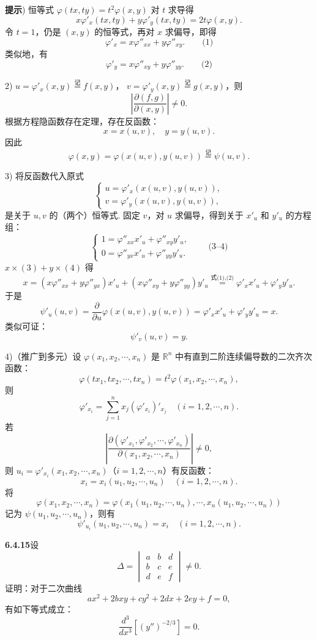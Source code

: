 \documentclass[UTF8,12pt,a4paper,fontset=fandol]{ctexart}
\begin{document}
\noindent\textbf{提示}) 恒等式 $\varphi(tx,ty)=t^2\varphi(x,y)$ 对 $t$ 求导得
\[
  x\varphi'_x(tx,ty)+y\varphi'_y(tx,ty)=2t\varphi(x,y).
\]
令 $t=1$，仍是 $(x,y)$ 的恒等式，再对 $x$ 求偏导，即得
\[
  \varphi'_x=x\varphi''_{xx}+y\varphi''_{xy}. \qquad\text{(1)}
\]
类似地，有
\[
  \varphi'_y=x\varphi''_{xy}+y\varphi''_{yy}. \qquad\text{(2)}
\]

2) $u=\varphi'_x(x,y)\overset{\text{记}}{=}f(x,y)$，
$v=\varphi'_y(x,y)\overset{\text{记}}{=}g(x,y)$，则
\[
  \left|\frac{\partial(f,g)}{\partial(x,y)}\right|\ne0.
\]
根据方程隐函数存在定理，存在反函数：
\[
  x=x(u,v),\quad y=y(u,v).
\]
因此
\[
  \varphi(x,y)=\varphi(x(u,v),y(u,v))\overset{\text{记}}{=}\psi(u,v).
\]

3) 将反函数代入原式
\[
\begin{cases}
  u=\varphi'_x(x(u,v),y(u,v)),\\
  v=\varphi'_y(x(u,v),y(u,v)),
\end{cases}
\]
是关于 $u,v$ 的（两个）恒等式. 固定 $v$，对 $u$ 求偏导，得到关于 $x'_u$ 和 $y'_u$ 的方程组：
\[
\begin{cases}
  1=\varphi''_{xx}x'_u+\varphi''_{xy}y'_u,\\
  0=\varphi''_{yx}x'_u+\varphi''_{yy}y'_u.
\end{cases}\qquad\text{(3--4)}
\]
$x\times(3)+y\times(4)$ 得
\[
  x=(x\varphi''_{xx}+y\varphi''_{yx})x'_u
  +(x\varphi''_{xy}+y\varphi''_{yy})y'_u
  \overset{\text{式(1),(2)}}{=}
  \varphi'_x x'_u+\varphi'_y y'_u.
\]
于是
\[
  \psi'_u(u,v)=\frac{\partial}{\partial u}\varphi(x(u,v),y(u,v))
  =\varphi'_x x'_u+\varphi'_y y'_u=x.
\]
类似可证：
\[
  \psi'_v(u,v)=y.
\]

4)（推广到多元）设 $\varphi(x_1,x_2,\cdots,x_n)$ 是 $\mathbb R^n$ 中有直到二阶连续偏导数的二次齐次函数：
\[
  \varphi(tx_1,tx_2,\cdots,tx_n)=t^2\varphi(x_1,x_2,\cdots,x_n),
\]
则
\[
  \varphi'_{x_i}=\sum_{j=1}^n x_j(\varphi'_{x_i})'_{x_j}
  \quad(i=1,2,\cdots,n).
\]
若
\[
  \left|
  \frac{\partial(\varphi'_{x_1},\varphi'_{x_2},\cdots,\varphi'_{x_n})}
       {\partial(x_1,x_2,\cdots,x_n)}
  \right|\ne0,
\]
则 $u_i=\varphi'_{x_i}(x_1,x_2,\cdots,x_n)$（$i=1,2,\cdots,n$）有反函数：
\[
  x_i=x_i(u_1,u_2,\cdots,u_n)\quad(i=1,2,\cdots,n).
\]
将
\[
  \varphi(x_1,x_2,\cdots,x_n)
  =
  \varphi(x_1(u_1,u_2,\cdots,u_n),\cdots,x_n(u_1,u_2,\cdots,u_n))
\]
记为 $\psi(u_1,u_2,\cdots,u_n)$，则有
\[
  \psi'_{u_i}(u_1,u_2,\cdots,u_n)=x_i\quad(i=1,2,\cdots,n).
\]

\noindent\textbf{6.4.15}\quad 设
\[
  \Delta=
  \begin{vmatrix}
    a&b&d\\
    b&c&e\\
    d&e&f
  \end{vmatrix}\ne0.
\]
证明：对于二次曲线
\[
  ax^2+2bxy+cy^2+2dx+2ey+f=0,
\]
有如下等式成立：
\[
  \frac{d^3}{dx^3}\left[(y'')^{-2/3}\right]=0.
\]
\end{document}
